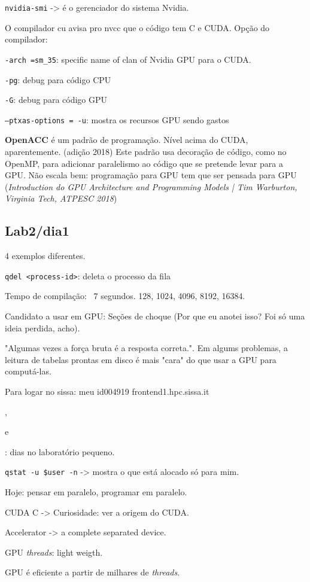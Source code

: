 \documentclass[12pt]{report} %
\begin{document}
\texttt{nvidia-smi} -> é o gerenciador do sistema Nvidia.

O compilador cu avisa pro nvcc que o código tem C e CUDA. Opção do compilador:

\texttt{-arch =sm\_35}: specific name of clan of Nvidia GPU para o CUDA. 

\texttt{-pg}: debug para código CPU

\texttt{-G}: debug para código GPU

\texttt{--ptxas-options = -u}: mostra os recursos GPU sendo gastos

\textbf{OpenACC} é um padrão de programação. Nível acima do CUDA, aparentemente.
(adição 2018) Este padrão usa decoração de código, como no OpenMP, para adicionar 
paralelismo ao código que se pretende levar para a GPU. Não escala bem: programação 
para GPU tem que ser pensada para GPU (\textit{Introduction do GPU Architecture and Programming Models | Tim Warburton, Virginia Tech, ATPESC 2018})


\subsection*{Lab2/dia1}

4 exemplos diferentes.

\texttt{qdel <process-id>}: deleta o processo da fila

Tempo de compilação: ~7 segundos. 128, 1024, 4096, 8192, 16384.

Candidato a usar em GPU: Seções de choque (Por que eu anotei isso? Foi só uma ideia perdida, acho).

"Algumas vezes a força bruta é a resposta correta.". Em algums problemas, a leitura 
de tabelas prontas em disco é mais "cara" do que usar a GPU para computá-las.

Para logar no sissa: meu id004919
frontend1.hpc.sissa.it

\date{26/05/2015}, \date{28/05/2015} e \date{03/06/2015}: dias no laboratório pequeno.

\texttt{qstat -u \$user -n}  -> mostra o que está alocado só para mim.

Hoje: pensar em paralelo, programar em paralelo.

CUDA C -> Curiosidade: ver a origem do CUDA.

Accelerator -> a complete separated device.

GPU \textit{threads}: light weigth.

GPU é eficiente a partir de milhares de \textit{threads}.
\end{document}
